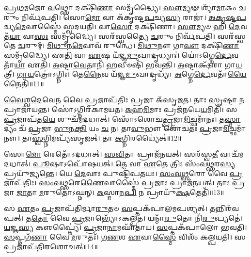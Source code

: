 \-\ul{𑌪𑍍𑌰}\-\-\ul{𑌥}\-\-\ul{𑌮}\-𑌜𑍋 \ul{𑌵}\-𑌥𑍍𑌸𑍋 𑌦𑌕𑍍𑌷𑌿᳴\-\ul{𑌣𑌾} 𑌸𑌮𑍃᳴𑌦𑍍𑌧𑍍𑌯𑍈।
\-\ul{𑌸𑍗}\-𑌮𑍍𑌯𑍟 𑌶𑍍𑌯𑌾᳴\-\ul{𑌮𑌾}\-𑌕𑌂 \ul{𑌚}\-𑌰𑍁𑌂 𑌨𑌿𑌰𑍍𑌵᳴𑌪𑌤𑌿।
𑌸𑍋\-\ul{𑌮𑍋} 𑌵𑌾 𑌅᳴𑌕𑍃𑌷𑍍𑌟\-\ul{𑌪}\-𑌚𑍍𑌯\-\ul{𑌸𑍍𑌯} 𑌰𑌾𑌜𑌾॑।
\-\ul{𑌅}\-\-\ul{𑌕𑍃}\-\-\ul{𑌷𑍍𑌟}\-\-\ul{𑌪}\-𑌚𑍍𑌯\-\ul{𑌮𑍇}\-𑌵𑌾𑌸𑍍𑌮𑍈॑ 𑌸𑍍𑌵𑌦𑌯𑌤𑌿।
𑌵𑌾\-\ul{𑌸𑍋} 𑌦𑌕𑍍𑌷𑌿᳴𑌣𑌾।
\-\ul{𑌸𑍗}\-𑌮𑍍𑌯𑍞 𑌹𑌿 \ul{𑌦𑍇}\-𑌵𑌤᳴\-\ul{𑌯𑌾} 𑌵𑌾\-\ul{𑌸𑌃} 𑌸𑌮𑍃᳴𑌦𑍍𑌧𑍍𑌯𑍈।
𑌸𑌰᳴𑌸𑍍𑌵𑌤𑍍𑌯𑍈 \ul{𑌚}\-𑌰𑍁𑌂 𑌨𑌿𑌰𑍍𑌵᳴𑌪𑌤𑌿।
𑌸𑌰᳴𑌸𑍍𑌵𑌤𑍇 \ul{𑌚}\-𑌰𑍁𑌮𑍍।
\-\ul{𑌮𑌿}\-\-\ul{𑌥𑍁}\-𑌨\-\ul{𑌮𑍇}\-𑌵𑌾𑌵᳴ 𑌰𑍁𑌨𑍍𑌧𑍇।
\-\ul{𑌮𑌿}\-\-\ul{𑌥𑍁}\-𑌨𑍗 𑌗𑌾\-\ul{𑌵𑍗} 𑌦𑌕𑍍𑌷𑌿᳴\-\ul{𑌣𑌾} 𑌸𑌮𑍃᳴𑌦𑍍𑌧𑍍𑌯𑍈।
𑌏\-\ul{𑌤𑌿} 𑌵𑌾 \ul{𑌏}\-𑌷 𑌯᳴𑌜𑍍𑌞\-\ul{𑌮𑍁}\-𑌖𑌾𑌦𑍃𑌧𑍍𑌯𑌾𑌃॑।
𑌯𑍋॑𑌽𑌗𑍍𑌨𑍇\-\ul{𑌰𑍍𑌦𑍇}\-𑌵𑌤𑌾᳴\-\ul{𑌯𑌾} 𑌏𑌤𑌿᳴।
\-\ul{𑌅}\-𑌷𑍍𑌟𑌾\-\ul{𑌵𑍇}\-𑌤𑌾𑌨𑌿᳴ \ul{𑌹}\-𑌵𑍀𑍞𑌷𑌿᳴ 𑌭𑌵𑌨𑍍𑌤𑌿।
\-\ul{𑌅}\-𑌷𑍍𑌟𑌾𑌕𑍍𑌷᳴𑌰𑌾 𑌗𑌾\-\ul{𑌯}\-𑌤𑍍𑌰𑍀।
\-\ul{𑌗𑌾}\-\-\ul{𑌯}\-𑌤𑍍𑌰𑍋॑\-𑌽𑌗𑍍𑌨𑌿𑌃।
𑌤𑍇\-\ul{𑌨𑍈}\-𑌵 𑌯᳴𑌜𑍍𑌞\-\ul{𑌮𑍁}\-𑌖𑌾𑌦𑍃𑌧𑍍𑌯𑌾᳴ \ul{𑌅}\-𑌗𑍍𑌨𑍇\-\ul{𑌰𑍍𑌦𑍇}\-𑌵𑌤𑌾᳴\-\ul{𑌯𑍈} 𑌨𑍈𑌤𑌿᳴॥11॥

\-\ul{𑌵𑍈}\-\-\ul{𑌶𑍍𑌵}\-\-\ul{𑌦𑍇}\-𑌵𑍇\-\ul{𑌨} 𑌵𑍈 \ul{𑌪𑍍𑌰}\-𑌜𑌾\-𑌪᳴𑌤𑌿𑌃 \ul{𑌪𑍍𑌰}\-𑌜𑌾 𑌅᳴\-𑌸𑍃𑌜𑌤।
𑌤𑌾𑌃 \ul{𑌸𑍃}\-𑌷𑍍𑌟𑌾 𑌨 𑌪𑍍𑌰𑌾𑌜𑌾᳴𑌯𑌨𑍍𑌤।
𑌸𑍋॑𑌽𑌗𑍍𑌨𑌿𑌰᳴𑌕𑌾𑌮𑌯𑌤।
\-\ul{𑌅}\-𑌹\-\ul{𑌮𑌿}\-𑌮𑌾𑌃 𑌪𑍍𑌰𑌜᳴𑌨𑌯𑍇\-\ul{𑌯}\-𑌮𑌿𑌤𑌿᳴।
𑌸 \ul{𑌪𑍍𑌰}\-𑌜𑌾𑌪᳴𑌤\-\ul{𑌯𑍇} 𑌶𑍁𑌚᳴𑌮𑌦𑌧𑌾𑌤𑍍।
𑌸𑍋᳴𑌽𑌶𑍋𑌚\-\ul{𑌤𑍍𑌪𑍍𑌰}\-𑌜𑌾\-\ul{𑌮𑌿}\-𑌚𑍍𑌛𑌮𑌾᳴𑌨𑌃।
𑌤\-\ul{𑌸𑍍𑌮𑌾}\-𑌦𑍍𑌯𑌂 𑌚᳴ \ul{𑌪𑍍𑌰}\-𑌜𑌾 \ul{𑌭𑍁}\-𑌨\-\ul{𑌕𑍍𑌤𑌿} 𑌯𑌂 \ul{𑌚} 𑌨।
𑌤𑌾\-\ul{𑌵𑍁}\-𑌭𑍗 𑌶𑍋᳴𑌚𑌤𑌃 \ul{𑌪𑍍𑌰}\-𑌜𑌾\-\ul{𑌮𑌿}\-𑌚𑍍𑌛𑌮𑌾᳴𑌨𑍗।
𑌤𑌾\-\ul{𑌸𑍍𑌵}\-𑌗𑍍𑌨𑌿𑌮𑌪𑍍𑌯᳴\-𑌸𑍃𑌜𑌤𑍍।
𑌤𑌾 \ul{𑌅}\-𑌗𑍍𑌨𑌿𑌰𑌧𑍍𑌯𑍈॑𑌤𑍍॥12॥

𑌸𑍋\-\ul{𑌮𑍋} 𑌰𑍇𑌤𑍋᳴\-𑌽𑌦𑌧𑌾𑌤𑍍।
\-\ul{𑌸}\-\-\ul{𑌵𑌿}\-𑌤𑌾 𑌪𑍍𑌰𑌾𑌜᳴𑌨𑌯𑌤𑍍।
𑌸𑌰᳴𑌸𑍍𑌵\-\ul{𑌤𑍀} 𑌵𑌾𑌚᳴𑌮𑌦𑌧𑌾𑌤𑍍।
\-\ul{𑌪𑍂}\-𑌷𑌾\-𑌽𑌪𑍋᳴𑌷𑌯𑌤𑍍।
𑌤𑍇 𑌵𑌾 \ul{𑌏}\-𑌤𑍇 𑌤𑍍𑌰𑌿𑌃 𑌸𑌂᳴𑌵\-\ul{𑌥𑍍𑌸}\-𑌰\-\ul{𑌸𑍍𑌯} 𑌪𑍍𑌰𑌯𑍁᳴𑌜𑍍𑌯𑌨𑍍𑌤𑍇।
𑌯𑍇 \ul{𑌦𑍇}\-𑌵𑌾𑌃 𑌪𑍁𑌷𑍍𑌟𑌿᳴𑌪𑌤𑌯𑌃।
\-\ul{𑌸𑌂}\-\-\ul{𑌵}\-\-\ul{𑌥𑍍𑌸}\-𑌰𑍋 𑌵𑍈 \ul{𑌪𑍍𑌰}\-𑌜𑌾\-𑌪᳴𑌤𑌿𑌃।
\-\ul{𑌸𑌂}\-\-\ul{𑌵}\-\-\ul{𑌥𑍍𑌸}\-𑌰𑍇\-\ul{𑌣𑍈}\-𑌵𑌾𑌸𑍍𑌮𑍈॑ \ul{𑌪𑍍𑌰}\-𑌜𑌾𑌃 𑌪𑍍𑌰𑌾𑌜᳴𑌨𑌯𑌤𑍍।
𑌤𑌾𑌃 \ul{𑌪𑍍𑌰}\-𑌜𑌾 \ul{𑌜𑌾}\-𑌤𑌾 \ul{𑌮}\-𑌰𑍁𑌤𑍋॑\-𑌽𑌘𑍍𑌨𑌨𑍍।
\-\ul{𑌅}\-𑌸𑍍𑌮𑌾𑌨\-\ul{𑌪𑌿} 𑌨 𑌪𑍍𑌰𑌾𑌯𑍁᳴\-\ul{𑌕𑍍𑌷}\-𑌤𑍇𑌤𑌿᳴॥13॥

𑌸 \ul{𑌏}\-𑌤𑌂 \ul{𑌪𑍍𑌰}\-𑌜𑌾𑌪᳴𑌤𑌿𑌰𑍍𑌮𑌾\-\ul{𑌰𑍁}\-𑌤𑍞 \ul{𑌸}\-𑌪𑍍𑌤𑌕᳴𑌪𑌾𑌲𑌮𑌪𑌶𑍍𑌯𑌤𑍍।
𑌤𑌨𑍍𑌨𑌿𑌰᳴𑌵𑌪𑌤𑍍।
𑌤\-\ul{𑌤𑍋} 𑌵𑍈 \ul{𑌪𑍍𑌰}\-𑌜𑌾𑌭𑍍𑌯𑍋᳴\-𑌽𑌕𑌲𑍍𑌪𑌤।
𑌯𑌨𑍍𑌮𑌾᳴\-\ul{𑌰𑍁}\-𑌤𑍋 𑌨𑌿᳴\-\ul{𑌰𑍁}\-𑌪𑍍𑌯𑌤𑍇॑।
\-\ul{𑌯}\-𑌜𑍍𑌞\-\ul{𑌸𑍍𑌯} 𑌕𑍢𑌪𑍍𑌤𑍍𑌯𑍈॑।
\-\ul{𑌪𑍍𑌰}\-𑌜𑌾\-\ul{𑌨𑌾}\-𑌮𑌘𑌾᳴𑌤𑌾𑌯।
\-\ul{𑌸}\-𑌪𑍍𑌤𑌕᳴𑌪𑌾𑌲𑍋 𑌭𑌵𑌤𑌿।
\-\ul{𑌸}\-𑌪𑍍𑌤𑌗᳴\-\ul{𑌣𑌾} 𑌵𑍈 \ul{𑌮}\-𑌰𑍁𑌤𑌃᳴।
\-\ul{𑌗}\-\-\ul{𑌣}\-𑌶 \ul{𑌏}\-𑌵𑌾\-\ul{𑌸𑍍𑌮𑍈} 𑌵𑌿𑌶𑌂᳴ 𑌕𑌲𑍍𑌪𑌯𑌤𑌿।
𑌸 \ul{𑌪𑍍𑌰}\-𑌜𑌾𑌪᳴𑌤𑌿𑌰𑌶𑍋𑌚𑌤𑍍॥14॥

